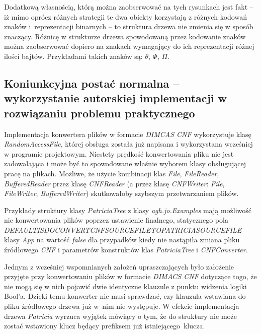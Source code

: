 	    Dodatkową własnością, którą można zaobserwować na tych rysunkach jest fakt -- iż mimo oprócz różnych strategii te dwa obiekty korzystają z różnych kodowań znaków i~reprezentacji binarnych -- to struktura drzewa nie zmienia się w sposób znaczący. Różnicę w strukturze drzewa spowodowaną przez kodowanie znaków można zaobserwować dopiero na znakach wymagający do ich reprezentacji różnej ilości bajtów. Przykładami takich znaków są: $\theta$, $\Phi$, $\Pi$.
		
		\subsection{Koniunkcyjna postać normalna -- wykorzystanie autorskiej implementacji w rozwiązaniu problemu praktycznego}\label{sec:czescPraktycznaRezultatyCNF}
		
		Implementacja konwertera plików w formacie \emph{DIMCAS CNF} wykorzystuje klasę \emph{RandomAccessFile}, której obsługa została już napisana i wykorzystana wcześniej w programie projektowym. Niestety prędkość konwertowania pliku nie jest zadowalająca i może być to spowodowane właśnie wyborem klasy obsługującej pracę na plikach. Możliwe, że użycie kombinacji klas \emph{File}, \emph{FileReader}, \emph{BufferedReader} przez klasę \emph{CNFReader} (a przez klasę \emph{CNFWriter}: \emph{File}, \emph{FileWriter}, \emph{BufferedWriter}) skutkowałoby szybszym przetwarzaniem plików.
		
		Przykłady struktury klasy \emph{PatriciaTree} z klasy \emph{agh.jo.Examples} mają możliwość nie konwertowania plików poprzez ustawienie finalnego, statycznego pola \emph{DEFAULT\textunderscore IS\textunderscore DO\textunderscore CONVERT\textunderscore CNF\textunderscore SOURCE\textunderscore FILE\textunderscore TO\textunderscore PATRICIA\textunderscore SOURCE\textunderscore FILE} klasy \emph{App} na wartość \emph{false} dla przypadków kiedy nie nastąpiła zmiana pliku źródłowego \emph{CNF} i parametrów konstruktów klas \emph{PatriciaTree} i \emph{CNFConverter}.\newpage
		
		Jednym z wcześniej wspomnianych założeń upraszczających było założenie przyjęte przy konwertowaniu plików w formacie \emph{DIMACS CNF} dotyczące togo, że nie mogą się w nich pojawić dwie identyczne klauzule z punktu widzenia logiki Bool'a. Dzięki temu konwerter nie musi sprawdzać, czy klauzula wstawiana do pliku źródłowego drzewa już w~nim nie występuje. W efekcie implementacja drzewa \emph{Patricia} wyrzuca wyjątek mówiący o tym, że do struktury nie może zostać wstawiony klucz będący prefiksem już istniejącego~klucza.
		
